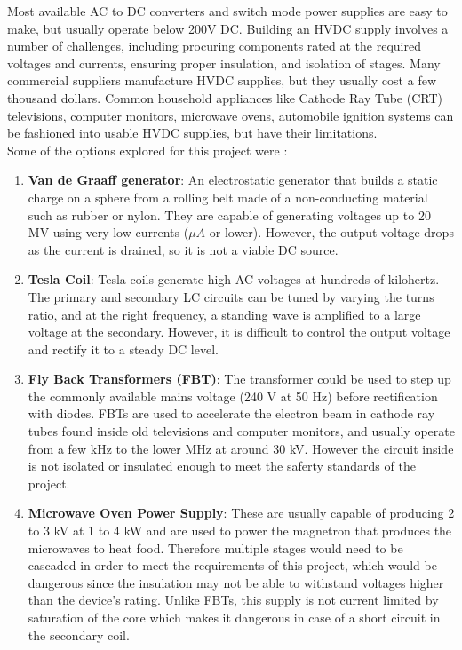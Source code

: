 \documentclass[11pt]{article}
\begin{document}
Most available AC to DC converters and switch mode power supplies are easy to make, but usually operate below 200V DC. Building an HVDC supply involves a number of challenges, including procuring components rated at the required voltages and currents, ensuring proper insulation, and isolation of stages. Many commercial suppliers manufacture HVDC supplies, but they usually cost a few thousand dollars. Common household appliances like Cathode Ray Tube (CRT) televisions, computer monitors, microwave ovens, automobile ignition systems can be fashioned into usable HVDC supplies, but have their limitations.\\

Some of the options explored for this project were \cite{panicker}:

\begin{enumerate}
\item \textbf{Van de Graaff generator}: An electrostatic generator that builds a static charge on a sphere from a rolling belt made of a non-conducting material such as rubber or nylon. They are capable of generating voltages up to 20 MV using very low currents ($\mu A$ or lower). However, the output voltage drops as the current is drained, so it is not a viable DC source.
\item \textbf{Tesla Coil}: Tesla coils generate high AC voltages at hundreds of kilohertz. The primary and secondary LC circuits can be tuned by varying the turns ratio, and at the right frequency, a standing wave is amplified to a large voltage at the secondary. However, it is difficult to control the output voltage and rectify it to a steady DC level.
\item \textbf{Fly Back Transformers (FBT)}: The transformer could be used to step up the commonly available mains voltage (240 V at 50 Hz) before rectification with diodes. FBTs are used to accelerate the electron beam in  cathode ray tubes found inside old televisions and computer monitors, and usually operate from a few kHz to the lower MHz at around 30 kV. However the circuit inside is not isolated or insulated enough to meet the saferty standards of the project.
\item \textbf{Microwave Oven Power Supply}: These are usually capable of producing 2 to 3 kV at 1 to 4 kW and are used to power the magnetron that produces the microwaves to heat food. Therefore multiple stages would need to be cascaded in order to meet the requirements of this project, which would be dangerous since the insulation may not be able to withstand voltages higher than the device's rating. Unlike FBTs, this supply is not current limited by saturation of the core which makes it dangerous in case of a short circuit in the secondary coil.

\end{enumerate}
\end{document}
